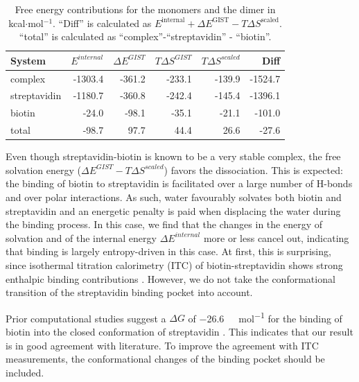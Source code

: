 \documentclass[9pt,tutorial]{livecoms}
\begin{document}
\begin{table}[h]
	\caption{Free energy contributions for the monomers and the dimer in kcal$\cdot$mol$^{-1}$. ``Diff'' is calculated as 
	$E^\text{internal} + \Delta E^\text{GIST} - T\Delta S^\text{scaled}$. ``total'' is calculated as 
	``complex''-``streptavidin'' - ``biotin''.}\label{tab_dg_monomers_dimer}
	\small
	\begin{tabular}{@{}lrrrrr@{}}
		\toprule
		System       & $E^{internal}$ & $\Delta E^\textit{GIST}$ & $T\Delta S^\textit{GIST}$ & $T\Delta S^\textit{scaled}$ & Diff \\
		\midrule
		complex      & -1303.4 & -361.2 & -233.1 & -139.9 & -1524.7 \\
		streptavidin & -1180.7 & -360.8 & -242.4 & -145.4 & -1396.1 \\
		biotin       & -24.0   &  -98.1 &  -35.1 &  -21.1 &  -101.0 \\
		\midrule
		total         & -98.7   &   97.7 &   44.4 &   26.6 &   -27.6 \\
		\bottomrule
	\end{tabular}
\end{table}
Even though streptavidin-biotin is known to be a very stable complex, the free solvation energy ($\Delta E^{GIST}-T\Delta S^{scaled}$) favors the dissociation.
This is expected: the binding of biotin to streptavidin is facilitated over a large number of H-bonds and over polar interactions. 
As such, water favourably solvates both biotin and streptavidin and an energetic penalty is paid when displacing the water during the binding process. 
In this case, we find that the changes in the energy of solvation and of the internal energy $\Delta E^{internal}$ more or less cancel out, indicating that binding is largely entropy-driven in this case.
At first, this is surprising, since isothermal titration calorimetry (ITC) of biotin-streptavidin shows strong enthalpic binding contributions \cite{mpye2020-biotin-itc,hyre2006-biotin-itc}.
However, we do not take the conformational transition of the streptavidin binding pocket into account.

Prior computational studies suggest a $\Delta G$ of \SI{-26.6}{\kilo\calorie\per\mole} for the binding of biotin into the closed conformation of streptavidin \cite{Bansal2018-biotin}.
This indicates that our result is in good agreement with literature.
To improve the agreement with ITC measurements, the conformational changes of the binding pocket should be included.
\end{document}

